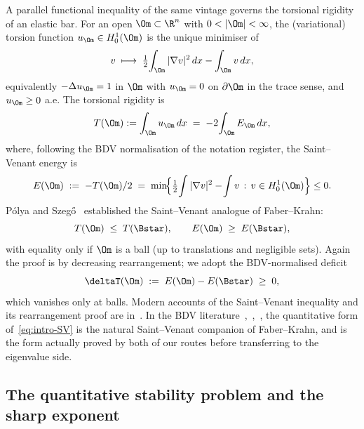 A parallel functional inequality of the same vintage governs the
torsional rigidity of an elastic bar. For an open
$\Om\subset\R^n$ with $0<|\Om|<\infty$, the (variational) torsion
function $u_\Om\in H^1_0(\Om)$ is the unique minimiser of
\[
   v\;\longmapsto\;
   \tfrac{1}{2}\!\int_\Om|\nabla v|^2\,dx-\int_\Om v\,dx,
\]
equivalently $-\Delta u_\Om=1$ in $\Om$ with $u_\Om=0$ on $\partial\Om$
in the trace sense, and $u_\Om\ge 0$ a.e. The torsional rigidity is
\begin{equation}\label{eq:intro-T}
   T(\Om):=\int_\Om u_\Om\,dx
   \;=\;-2\!\int_\Om E_\Om\,dx,
\end{equation}
where, following the BDV normalisation of the notation register, the
Saint--Venant energy is
\begin{equation}\label{eq:intro-E}
   E(\Om)\;:=\;-T(\Om)/2
   \;=\;
   \min\!\Bigl\{\tfrac{1}{2}\!\int|\nabla v|^2-\!\int v\,:\,
      v\in H^1_0(\Om)\Bigr\}\le 0.
\end{equation}
Pólya and Szeg\H o~\cite{PolyaSzego1951} established the Saint--Venant
analogue of Faber--Krahn:
\begin{equation}\label{eq:intro-SV}
   T(\Om)\;\le\;T(\Bstar),
   \qquad
   E(\Om)\;\ge\;E(\Bstar),
\end{equation}
with equality only if $\Om$ is a ball (up to translations and
negligible sets). Again the proof is by decreasing rearrangement; we
adopt the BDV-normalised deficit
\begin{equation}\label{eq:intro-deltaT}
   \deltaT(\Om)\;:=\;E(\Om)-E(\Bstar)\;\ge\;0,
\end{equation}
which vanishes only at balls. Modern accounts of the Saint--Venant
inequality and its rearrangement proof are
in~\cite{KawohlBook,Bandle1980,Kesavan2006,HenrotBook,PolyaSzego1951}.
In the BDV
literature~\cite[\S2]{BDV},~\cite[\S2]{Brasco2014},~\cite[\S2]{BraDeP2017},
the quantitative form of~\eqref{eq:intro-SV} is the natural Saint--Venant
companion of Faber--Krahn, and is the form actually proved by both
of our routes before transferring to the eigenvalue side.

\subsection{The quantitative stability problem and the sharp exponent}
\label{ssec:intro-sharp-exponent}

